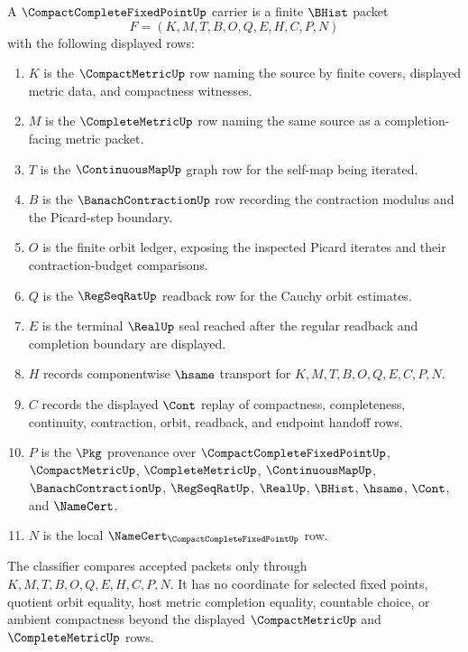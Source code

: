 \begin{definition}
\label{def:compact-complete-fixed-point-carrier}
A $\CompactCompleteFixedPointUp$ carrier is a finite $\BHist$ packet
$$
F=(K,M,T,B,O,Q,E,H,C,P,N)
$$
with the following displayed rows:
\begin{enumerate}
\item $K$ is the $\CompactMetricUp$ row naming the source by finite covers, displayed metric data, and compactness witnesses.
\item $M$ is the $\CompleteMetricUp$ row naming the same source as a completion-facing metric packet.
\item $T$ is the $\ContinuousMapUp$ graph row for the self-map being iterated.
\item $B$ is the $\BanachContractionUp$ row recording the contraction modulus and the Picard-step boundary.
\item $O$ is the finite orbit ledger, exposing the inspected Picard iterates and their contraction-budget comparisons.
\item $Q$ is the $\RegSeqRatUp$ readback row for the Cauchy orbit estimates.
\item $E$ is the terminal $\RealUp$ seal reached after the regular readback and completion boundary are displayed.
\item $H$ records componentwise $\hsame$ transport for $K,M,T,B,O,Q,E,C,P,N$.
\item $C$ records the displayed $\Cont$ replay of compactness, completeness, continuity, contraction, orbit, readback, and endpoint handoff rows.
\item $P$ is the $\Pkg$ provenance over $\CompactCompleteFixedPointUp$, $\CompactMetricUp$, $\CompleteMetricUp$, $\ContinuousMapUp$, $\BanachContractionUp$, $\RegSeqRatUp$, $\RealUp$, $\BHist$, $\hsame$, $\Cont$, and $\NameCert$.
\item $N$ is the local $\NameCert_{\CompactCompleteFixedPointUp}$ row.
\end{enumerate}
The classifier compares accepted packets only through $K,M,T,B,O,Q,E,H,C,P,N$. It has no coordinate for selected fixed points, quotient orbit equality, host metric completion equality, countable choice, or ambient compactness beyond the displayed $\CompactMetricUp$ and $\CompleteMetricUp$ rows.
\end{definition}

